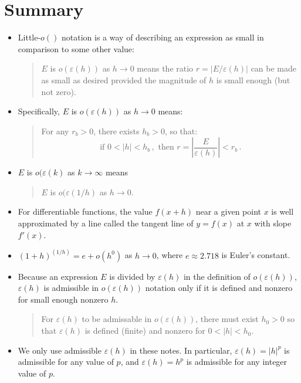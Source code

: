 \section{Summary}
\begin{itemize}
\item
Little-$o()$ notation is a way of describing an expression as small in comparison to some other value: 
\begin{quote}
  $E$ is $o(\varepsilon(h))$ as $h \rightarrow 0$ means the ratio  $r = |E/\varepsilon(h)|$  can be made as small as desired provided the magnitude of $h$ is small enough (but not zero).
\end{quote}

\item
Specifically,  $E$ is $o(\varepsilon(h))$  as $h \rightarrow 0$  means:  
\begin{quote} 
For any  $r_b > 0$,  there exists $h_b > 0$,  so that:
\begin{equation*}
\text{if\ } 0 < | h | < h_b\,,\text{\ then\ }r=\left|\frac{E}{\varepsilon(h)}\right|<r_b\,.
\end{equation*}
\end{quote}

\item 
$E$ is $o(\varepsilon(k)$ as $k \rightarrow \infty$ means
\begin{quote}
$E$ is $o(\varepsilon(1/h)$ as $h \rightarrow 0$.
\end{quote}

\item 
For differentiable functions, the value $f(x+h)$ near a given point $x$ is well  approximated by a line called the tangent line of $y=f(x)$  at $x$ with slope $f'(x)$.

\item ${(1+h)}^{(1/h)} = e + o(h^0)$ as $h \rightarrow 0$,  where  $e \approx 2.718$ is Euler’s constant.

\item Because an expression $E$ is divided by $\varepsilon(h)$ in the definition of $o(\varepsilon(h))$, $\varepsilon(h)$  is admissible in $o(\varepsilon(h))$ notation only if it is defined and nonzero for small enough nonzero $h$.
\begin{quote}
For $\varepsilon(h)$ to be admissable in $o(\varepsilon(h))$, there must exist $h_0 > 0$ so that $\varepsilon(h)$ is defined (finite) and nonzero for $0 < | h | < h_0$.
\end{quote}

\item We only use admissible $\varepsilon(h)$ in these notes.  In particular,  $\varepsilon(h) = {|h|}^p$ is admissible for any value of $p$,  and $\varepsilon(h) = h^p$ is admissible for any integer value of $p$.
\end{itemize}

